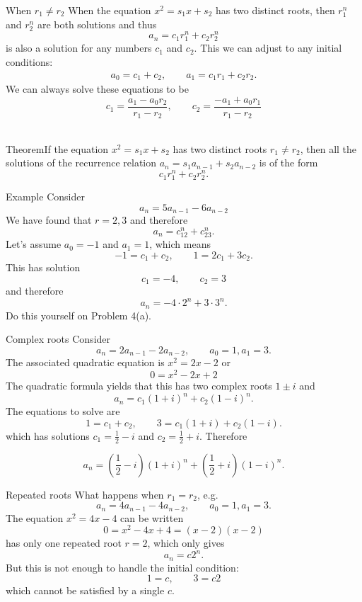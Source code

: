 \documentclass{beamer}
\def\bl[#1]#2{\begin{block}{#1}#2\end{block}}
\begin{document}
\begin{frame}{When $r_1\neq r_2$}
When the equation $x^2=s_1x+s_2$ has two distinct roots, then $r_1^n$ and $r_2^n$ are both solutions and thus
\[
a_n=c_1r_1^n+c_2r_2^n
\]
is also a solution for any numbers $c_1$ and $c_2$. This we can adjust to any initial conditions:\vspace{-0.2cm}
\begin{align*}
a_0=c_1+c_2, \qquad a_1=c_1r_1+c_2r_2.
\end{align*}
We can always solve these equations to be
\[
c_1=\frac{a_1-a_0r_2}{r_1-r_2},\qquad c_2=\frac{-a_1+a_0r_1}{r_1-r_2}
\]\vspace{-0.4cm}\\
\bl[Theorem]{If the equation $x^2=s_1x+s_2$ has two distinct roots $r_1\neq r_2$, then all the solutions of the recurrence relation $a_n=s_1a_{n-1}+s_2a_{n-2}$ is of the form
\[
c_1r_1^n+c_2r_2^n.
\]
}
\end{frame}

\begin{frame}{Example}
Consider
\[
a_n=5a_{n-1}-6a_{n-2}
\]
We have found that $r=2,3$ and therefore
\[
a_n=c_12^n+c_23^n.
\]
Let's assume $a_0=-1$ and $a_1=1$, which means
\[
-1=c_1+c_2,\qquad 1=2c_1+3c_2.
\]
This has solution
\[
c_1=-4,\qquad c_2=3
\]
and therefore
\[
a_n=-4\cdot 2^n+3\cdot 3^n.
\]
\center Do this yourself on Problem 4(a).
\end{frame}

\begin{frame}{Complex roots}
Consider
\[
a_n=2a_{n-1}-2a_{n-2},\qquad a_0=1,a_1=3.
\]
The associated quadratic equation is $x^2=2x-2$ or
\[
0=x^2-2x+2
\]
The quadratic formula yields that this has two complex roots $1\pm i$ and
\[
a_n=c_1(1+i)^n+c_2(1-i)^n.
\]
The equations to solve are
\[
1=c_1+c_2,\qquad 3=c_1(1+i)+c_2(1-i).
\]
which has solutions $c_1=\frac{1}{2}-i$ and $c_2=\frac{1}{2}+i$. Therefore
\bl[]{
\[
a_n=\left(\frac{1}{2}-i\right)(1+i)^n+\left(\frac{1}{2}+i\right)(1-i)^n.
\]}
\end{frame}

\begin{frame}{Repeated roots}
What happens when $r_1=r_2$, e.g.
\[
a_n=4a_{n-1}-4a_{n-2},\qquad a_0=1,a_1=3.
\]
The equation $x^2=4x-4$ can be written
\[
0=x^2-4x+4=(x-2)(x-2)
\]
 has only one repeated root $r=2$, which only gives
\[
a_n=c2^n.
\]
But this is not enough to handle the initial condition:
\[
1=c,\qquad 3=c2
\]
which cannot be satisfied by a single $c$.
\end{frame}
\end{document}
